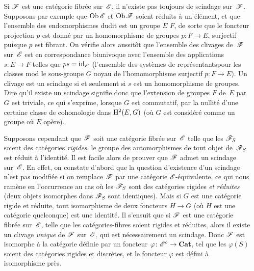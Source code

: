 Si $\cal{F}$ est une cat\'egorie fibr\'ee sur~$\cal{E}$, il
n'existe pas toujours de scindage sur~$\cal{F}$. Supposons par exemple
que $\Ob\cal{E}$ et $\Ob\cal{F}$ soient r\'eduits \`a un
\'el\'ement, et que l'ensemble des endomorphismes dudit est un
groupe $E$ \resp $F$, de sorte que le foncteur projection $p$ est
donn\'e par un homomorphisme de groupes $p\colon F\to E$, surjectif
puisque $p$ est fibrant. On v\'erifie alors aussit\^ot que
l'ensemble des clivages de~$\cal{F}$ sur~$\cal{E}$ est en
correspondance biunivoque avec l'ensemble des applications $s\colon
E\to F$ telles que $ps=\mathrm{id}_E$ (\ie l'ensemble des \og syst\`emes de
repr\'esentants\fg pour les classes mod le sous-groupe $G$ noyau de
l'homomorphisme surjectif $p\colon F\to E$). Un clivage est un
scindage si et seulement si $s$ est un homomorphisme de groupes. Dire
qu'il existe un scindage signifie donc que l'extension de groupes $F$
de~$E$ par $G$ est triviale, ce qui s'exprime, lorsque $G$ est
commutatif, par la nullit\'e d'une certaine classe de cohomologie
dans $\mathrm{H}^2(E,G)$ (o\`u $G$ est consid\'er\'e comme un groupe
o\`u $E$ op\`ere).

Supposons cependant que $\cal{F}$ soit une cat\'egorie fibr\'ee
sur~$\cal{E}$ telle que les
$\cal{F}_S$ soient des cat\'egories \emph{rigides}, \ie le groupe
des automorphismes de tout objet de~$\cal{F}_S$ est r\'eduit \`a
l'identit\'e. Il est facile alors de prouver que $\cal{F}$ admet un
scindage sur~$\cal{E}$. En effet, on constate d'abord que la question
d'existence d'un scindage n'est pas modifi\'ee si on remplace
$\cal{F}$ par une cat\'egorie $\cal{E}$-\'equivalente, ce qui nous
ram\`ene en l'occurrence au cas o\`u les $\cal{F}_S$ sont des
cat\'egories rigides \emph{et réduites} (\ie deux objets
isomorphes dans $\cal{F}_S$ sont identiques). Mais si $G$ est une
cat\'egorie rigide et r\'eduite, tout isomorphisme de deux
foncteurs $H\to G$ (o\`u $H$ est une cat\'egorie quelconque) est
une identit\'e. Il s'ensuit que si $\cal{F}$ est une cat\'egorie
fibr\'ee sur~$\cal{E}$, telle que les cat\'egories-fibres soient
rigides et r\'eduites, alors il existe un clivage \emph{unique} de
$\cal{F}$ sur~$\cal{E}$, qui est n\'ecessairement un scindage. Donc
$\cal{F}$ est isomorphe \`a la cat\'egorie d\'efinie par un
foncteur $\varphi\colon \cal{E}^\circ\to \Cat$, tel que les
$\varphi(S)$ soient des cat\'egories rigides et discr\`etes, et le
foncteur $\varphi$ est d\'efini \`a isomorphisme pr\`es.

